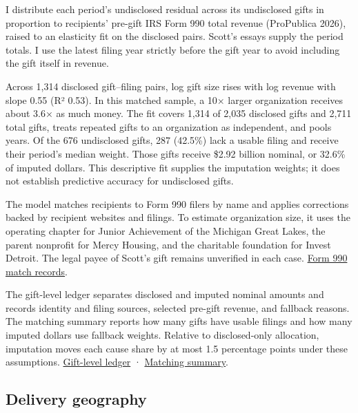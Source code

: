 \documentclass[
  11pt,
  letterpaper,
  DIV=11,
  numbers=noendperiod]{scrartcl}
\begin{document}
I distribute each period's undisclosed residual across its undisclosed
gifts in proportion to recipients' pre-gift IRS Form 990 total revenue
(ProPublica 2026), raised to an elasticity fit on the disclosed pairs.
Scott's essays supply the period totals. I use the latest filing year
strictly before the gift year to avoid including the gift itself in
revenue.

Across 1,314 disclosed gift--filing pairs, log gift size rises with log
revenue with slope 0.55 (R² 0.53). In this matched sample, a 10× larger
organization receives about 3.6× as much money. The fit covers 1,314 of
2,035 disclosed gifts and 2,711 total gifts, treats repeated gifts to an
organization as independent, and pools years. Of the 676 undisclosed
gifts, 287 (42.5\%) lack a usable filing and receive their period's
median weight. Those gifts receive \$2.92 billion nominal, or 32.6\% of
imputed dollars. This descriptive fit supplies the imputation weights;
it does not establish predictive accuracy for undisclosed gifts.

The model matches recipients to Form 990 filers by name and applies
corrections backed by recipient websites and filings. To estimate
organization size, it uses the operating chapter for Junior Achievement
of the Michigan Great Lakes, the parent nonprofit for Mercy Housing, and
the charitable foundation for Invest Detroit. The legal payee of Scott's
gift remains unverified in each case.
\href{https://github.com/MaxGhenis/mackenzie-scott-qaly/blob/main/data/yieldgiving/match_audit.jsonl}{Form
990 match records}.

The gift-level ledger separates disclosed and imputed nominal amounts
and records identity and filing sources, selected pre-gift revenue, and
fallback reasons. The matching summary reports how many gifts have
usable filings and how many imputed dollars use fallback weights.
Relative to disclosed-only allocation, imputation moves each cause share
by at most 1.5 percentage points under these assumptions.
\href{https://github.com/MaxGhenis/mackenzie-scott-qaly/blob/main/results/gift_ledger.csv}{Gift-level
ledger} ·
\href{https://github.com/MaxGhenis/mackenzie-scott-qaly/blob/main/web/matching_diagnostics.json}{Matching
summary}.

\subsection{Delivery geography}\label{delivery-geography}
\end{document}
